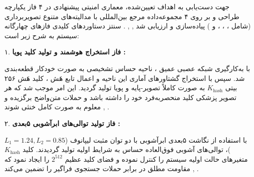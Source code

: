 



جهت دست‌یابی به اهداف تعیین‌شده، معماری امنیتی پیشنهادی در ۴ فاز یکپارچه طراحی و بر روی ۴ مجموعه‌داده مرجع بین‌المللی با مدالیته‌های متنوع تصویربرداری (شامل ، ، ، و ) پیاده‌سازی و ارزیابی شد , , . سنتز دستاوردهای کلیدی فازهای چهارگانه سیستم به شرح زیر است:\par



۱. \textbf{فاز استخراج هوشمند  و تولید کلید پویا :}\par

با به‌کارگیری شبکه عصبی عمیق ، ناحیه حساس تشخیصی  به صورت خودکار قطعه‌بندی شد. سپس با استخراج گشتاورهای آماری این ناحیه و اعمال تابع هَش ، کلید هَش ۲۵۶ بیتی $K_{\mathrm{hash}}$ به صورت کاملاً تصویر{-}پایه و پویا تولید گردید. این امر موجب شد که هر تصویر پزشکی کلید منحصر‌به‌فرد خود را داشته باشد و حملات متن‌واضح برگزیده  و معلوم  به صورت کامل خنثی شوند , .\par



۲. \textbf{فاز تولید توالی‌های ابرآشوبی ۵بعدی :}\par

با استفاده از نگاشت ۵بعدی ابرآشوبی با دو توان مثبت لیپانوف ($L_1 = 1.24,\allowbreak{} L_2 = 0.85$)، توالی‌های آشوبی فوق‌العاده حساس به شرایط اولیه تولید گردیدند. کلید $K_{\mathrm{hash}}$ متغیرهای حالت اولیه سیستم را کنترل نموده و فضای کلید عظیم $2^{512}$ را ایجاد نمود که مقاومت مطلق در برابر حملات جستجوی فراگیر  را تضمین می‌کند , .\par

